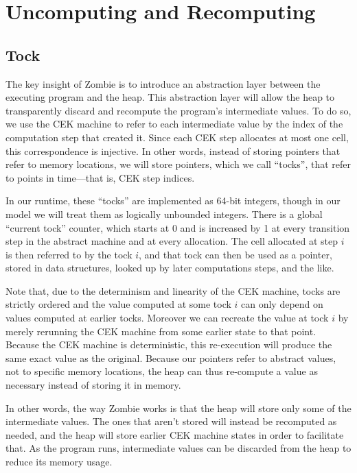 \section{Uncomputing and Recomputing}
\subsection{Tock}

The key insight of Zombie is to introduce an abstraction layer between the executing program and the heap. This abstraction layer will allow the heap to transparently discard and recompute the program's intermediate values. To do so, we use the CEK machine to refer to each intermediate value by the index of the computation step that created it. Since each CEK step allocates at most one cell, this correspondence is injective. In other words, instead of storing pointers that refer to memory locations, we will store pointers, which we call ``tocks'', that refer to points in time---that is, CEK step indices.

In our runtime, these ``tocks'' are implemented as 64-bit integers, though in our model we will treat them as logically unbounded integers. There is a global ``current tock'' counter, which starts at 0 and is increased by 1 at every transition step in the abstract machine and at every allocation. The cell allocated at step $i$ is then referred to by the tock $i$, and that tock can then be used as a pointer, stored in data structures, looked up by later computations steps, and the like.

Note that, due to the determinism and linearity of the CEK machine, tocks are strictly ordered and the value computed at some tock $i$ can only depend on values computed at earlier tocks. Moreover we can recreate the value at tock $i$ by merely rerunning the CEK machine from some earlier state to that point. Because the CEK machine is deterministic, this re-execution will produce the same exact value as the original. Because our pointers refer to abstract values, not to specific memory locations, the heap can thus re-compute a value as necessary instead of storing it in memory.

In other words, the way Zombie works is that the heap will store only some of the intermediate values. The ones that aren't stored will instead be recomputed as needed, and the heap will store earlier CEK machine states in order to facilitate that. As the program runs, intermediate values can be discarded from the heap to reduce its memory usage.

